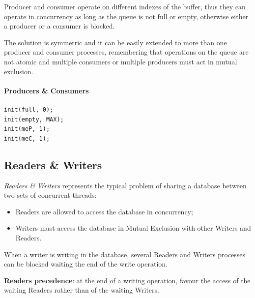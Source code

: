 Producer and consumer operate on different indexes of the buffer, thus they can operate in concurrency as long as the queue is not full or empty, otherwise either a producer or a consumer is blocked.

The solution is symmetric and it can be easily extended to more than one producer and consumer processes, remembering that operations on the queue are not atomic and multiple consumers or multiple producers must act in mutual exclusion.

\paragraph{Producers \& Consumers}
\begin{verbatim}
init(full, 0);
init(empty, MAX);
init(meP, 1);
init(meC, 1);
\end{verbatim}

\begin{Parallel}{}{}
\end{Parallel}

\newpage

\subsection{Readers \& Writers}
\emph{Readers \& Writers} represents the typical problem of sharing a database between two sets of concurrent threads:
\begin{itemize}
\item Readers are allowed to access the database in concurrency;
\item Writers must access the database in Mutual Exclusion with other Writers and Readers.
\end{itemize}
When a writer is writing in the database, several Readers and Writers processes can be blocked waiting the end of the write operation.

\textbf{Readers precedence}: at the end of a writing operation, favour the access of the waiting Readers rather than of the waiting Writers.

